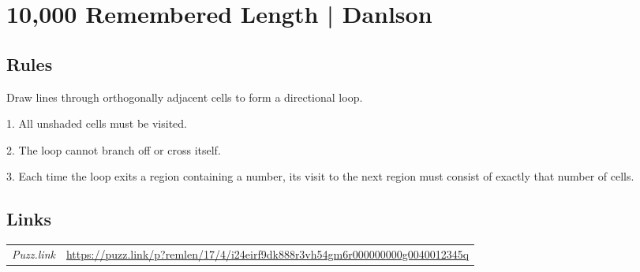 \section[10,000 Remembered Length | Danlson {[\emph{Remembered Length}]}]{10,000 Remembered Length | {\normalfont Danlson}}
\label{sec:07-10000-remembered-length-danlson}

\subsection*{Rules}
\begin{markdown}
Draw lines through orthogonally adjacent cells to form a directional loop.

1. All unshaded cells must be visited.

2. The loop cannot branch off or cross itself.

3. Each time the loop exits a region containing a number, its visit to the next region must consist of exactly that number of cells.
\end{markdown}
\subsection*{Links}
\begin{tabularx}{\textwidth}{l X}
\emph{Puzz.link} & \url{https://puzz.link/p?remlen/17/4/i24eirf9dk888r3vh54gm6r000000000g0040012345q} \\
\end{tabularx}
\pagebreak
